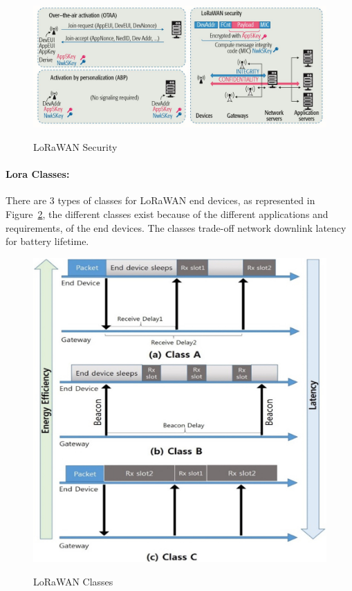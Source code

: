 \begin{figure}[ht]
  \centering
    {\includegraphics[height=2.3 in,width=0.80\linewidth]{Chapters/Figures/LoRaSecurity.JPG}}%
  \caption{LoRaWAN Security~\cite{Navarro-Ortiz2018}}
  \label{fig:lora_security}
\end{figure}



\paragraph{Lora Classes:}
\label{par: lora_classes_sota}


There are 3 types of classes for LoRaWAN end devices, as represented in Figure~\ref{fig:lora_classes}, the different classes exist because of the different applications and requirements, of the end devices. The classes trade-off network downlink latency for battery lifetime. 

\begin{figure}[htbp]
  \centering
    {\includegraphics[width=0.6\linewidth]{Chapters/Figures/loraclasses.jpg}}%
  \caption{LoRaWAN Classes~\cite{Sinha2017}}
  \label{fig:lora_classes}
\end{figure}

